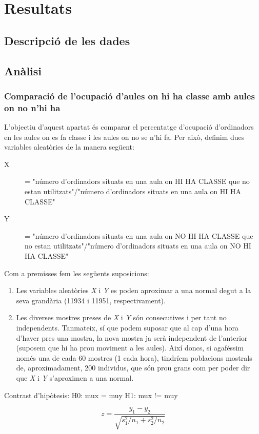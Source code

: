 \section{Resultats}

\subsection{Descripció de les dades}


\subsection{Anàlisi}
\subsubsection{Comparació de l'ocupació d'aules on hi ha classe amb aules on no n'hi ha}
L'objectiu d'aquest apartat és comparar el percentatge d'ocupació d'ordinadors en les aules on es fa classe i les aules on no se n'hi fa. Per això, definim dues variables aleatòries de la manera següent:
\begin{description}
\item[X] = "número d'ordinadors situats en una aula on HI HA CLASSE que no estan utilitzats"/"número d'ordinadors situats en una aula on HI HA CLASSE"
\item[Y] = "número d'ordinadors situats en una aula on NO HI HA CLASSE que no estan utilitzats"/"número d'ordinadors situats en una aula on NO HI HA CLASSE"
\end{description}

Com a premisses fem les següents suposicions:
\begin{enumerate}
	\item Les variables aleatòries \emph{X} i \emph{Y} es poden aproximar a una normal degut a la seva grandària (11934 i 11951, respectivament).
	\item Les diverses mostres preses de \emph{X} i \emph{Y} són consecutives i per tant no independents. Tanmateix, sí que podem suposar que al cap d'una hora d'haver pres una mostra, la nova mostra ja serà independent de l'anterior (suposem que hi ha prou moviment a les aules). Així doncs, si agaféssim només una de cada 60 mostres (1 cada hora), tindríem poblacions mostrals de, aproximadament, 200 individus, que són prou grans com per poder dir que \emph{X} i \emph{Y} s'aproximen a una normal.
\end{enumerate}

Contrast d'hipòtesis:
H0: mux = muy
H1: mux != muy

\[z = \frac{y_1 - y_2}{\sqrt{s_1^2/n_1 + s_2^2/n_2}} \]
